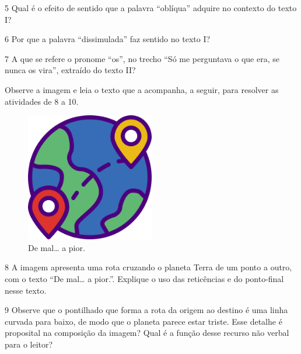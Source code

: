 \num{5} Qual é o efeito de sentido que a palavra ``oblíqua'' adquire no
contexto do texto I?


\num{6} Por que a palavra ``dissimulada'' faz sentido no texto I?


\num{7} A que se refere o pronome ``os'', no trecho ``Só me perguntava o
que era, se nunca os vira'', extraído do texto II?


Observe a imagem e leia o texto que a acompanha, a seguir, para
resolver as atividades de 8 a 10.


\begin{figure}[H]
\centering\includegraphics[width=0.5\textwidth]{./imgSAEB_6_POR/freepik/PORT_6_IMG-17.jpeg}
\caption{De mal\ldots{} a pior.}
\end{figure}


\num{8} A imagem apresenta uma rota cruzando o planeta Terra de um ponto
a outro, com o texto ``De mal\ldots{} a pior.''. Explique o uso das
reticências e do ponto-final nesse texto.


\num{9} Observe que o pontilhado que forma a rota da origem ao destino é
uma linha curvada para baixo, de modo que o planeta parece estar triste.
Esse detalhe é proposital na composição da imagem? Qual é a função desse
recurso não verbal para o leitor?

